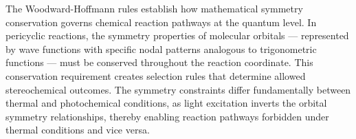 The Woodward-Hoffmann rules establish how mathematical symmetry conservation governs chemical reaction pathways at the quantum level. In pericyclic reactions, the symmetry properties of molecular orbitals — represented by wave functions with specific nodal patterns analogous to trigonometric functions — must be conserved throughout the reaction coordinate. This conservation requirement creates selection rules that determine allowed stereochemical outcomes. The symmetry constraints differ fundamentally between thermal and photochemical conditions, as light excitation inverts the orbital symmetry relationships, thereby enabling reaction pathways forbidden under thermal conditions and vice versa.
